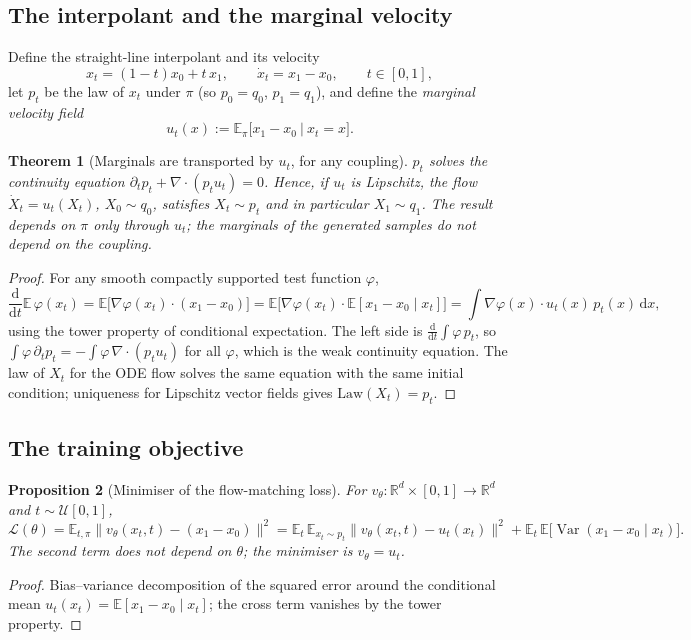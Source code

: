 \documentclass[11pt]{article}
\newtheorem{proposition}{Proposition}[section]
\newtheorem{theorem}[proposition]{Theorem}
\theoremstyle{definition}
\newcommand{\E}{\mathbb{E}}
\newcommand{\R}{\mathbb{R}}
\newcommand{\dd}{\mathrm{d}}
\newcommand{\Var}{\operatorname{Var}}
\begin{document}
\subsection{The interpolant and the marginal velocity}

Define the straight-line interpolant and its velocity
\begin{equation}
x_t=(1-t)x_0+t\,x_1,\qquad \dot x_t=x_1-x_0,\qquad t\in[0,1],
\end{equation}
let $p_t$ be the law of $x_t$ under $\pi$ (so $p_0=q_0$, $p_1=q_1$), and define the \emph{marginal velocity field}
\begin{equation}
u_t(x):=\E_\pi\big[x_1-x_0\ \big|\ x_t=x\big].
\label{eq:ut}
\end{equation}

\begin{theorem}[Marginals are transported by $u_t$, for any coupling]\label{thm:fm}
$p_t$ solves the continuity equation $\partial_tp_t+\nabla\cdot(p_tu_t)=0$. Hence, if $u_t$ is Lipschitz, the flow $\dot X_t=u_t(X_t)$, $X_0\sim q_0$, satisfies $X_t\sim p_t$ and in particular $X_1\sim q_1$. The result depends on $\pi$ only through $u_t$; the marginals of the generated samples do not depend on the coupling.
\end{theorem}
\begin{proof}
For any smooth compactly supported test function $\varphi$,
\begin{equation}
\frac{\dd}{\dd t}\E\,\varphi(x_t)=\E\big[\nabla\varphi(x_t)\cdot(x_1-x_0)\big]
=\E\Big[\nabla\varphi(x_t)\cdot\E[x_1-x_0\mid x_t]\Big]=\int\nabla\varphi(x)\cdot u_t(x)\,p_t(x)\,\dd x,
\end{equation}
using the tower property of conditional expectation. The left side is $\frac{\dd}{\dd t}\int\varphi\,p_t$, so $\int\varphi\,\partial_tp_t=-\int\varphi\,\nabla\cdot(p_tu_t)$ for all $\varphi$, which is the weak continuity equation. The law of $X_t$ for the ODE flow solves the same equation with the same initial condition; uniqueness for Lipschitz vector fields gives $\mathrm{Law}(X_t)=p_t$.
\end{proof}

\subsection{The training objective}

\begin{proposition}[Minimiser of the flow-matching loss]\label{prop:loss}
For $v_\theta:\R^{d}\times[0,1]\to\R^d$ and $t\sim\mathcal U[0,1]$,
\begin{equation}
\mathcal L(\theta)=\E_{t,\pi}\big\|v_\theta(x_t,t)-(x_1-x_0)\big\|^2
=\E_{t}\,\E_{x_t\sim p_t}\big\|v_\theta(x_t,t)-u_t(x_t)\big\|^2+\E_t\,\E\big[\Var(x_1-x_0\mid x_t)\big].
\end{equation}
The second term does not depend on $\theta$; the minimiser is $v_\theta=u_t$.
\end{proposition}
\begin{proof}
Bias--variance decomposition of the squared error around the conditional mean $u_t(x_t)=\E[x_1-x_0\mid x_t]$; the cross term vanishes by the tower property.
\end{proof}
\end{document}
